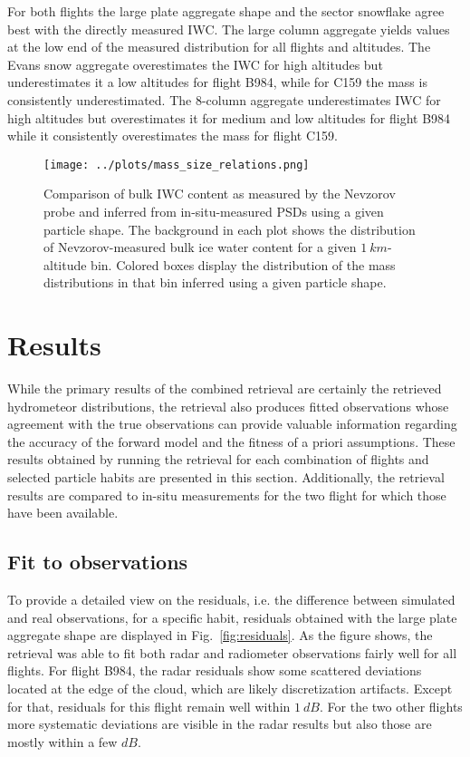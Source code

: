 \documentclass[journal abbreviation, manuscript]{copernicus}
\begin{document}
For both flights the large plate aggregate shape and the sector snowflake agree
best with the directly measured IWC. The large column aggregate yields values at
the low end of the measured distribution for all flights and altitudes. The
Evans snow aggregate overestimates the IWC for high altitudes but underestimates
it a low altitudes for flight B984, while for C159 the mass is consistently
underestimated. The 8-column aggregate underestimates IWC for high altitudes but
overestimates it for medium and low altitudes for flight B984 while it
consistently overestimates the mass for flight C159.

\begin{figure}
  \centering
  \texttt{[image: ../plots/mass\_size\_relations.png]}
  \caption{
    Comparison of bulk IWC content as measured by the Nevzorov probe and
    inferred from in-situ-measured PSDs using a given particle shape. The
    background in each plot shows the distribution of Nevzorov-measured bulk
    ice water content for a given $1\ \unit{km}$-altitude bin. Colored boxes
    display the distribution of the mass distributions in that bin inferred
    using a given particle shape.
    }
  \label{fig:mass_size_relation}
\end{figure}


\section{Results}
\label{sec:results}

While the primary results of the combined retrieval are certainly the retrieved
hydrometeor distributions, the retrieval also produces fitted observations whose
agreement with the true observations can provide valuable information regarding
the accuracy of the forward model and the fitness of a priori assumptions. These
results obtained by running the retrieval for each combination of flights and
selected particle habits are presented in this section. Additionally, the
retrieval results are compared to in-situ measurements for the two flight for
which those have been available.


\subsection{Fit to observations}

To provide a detailed view on the residuals, i.e. the difference between
simulated and real observations, for a specific habit, residuals obtained with
the large plate aggregate shape are displayed in Fig.~\ref{fig:residuals}. As
the figure shows, the retrieval was able to fit both radar and radiometer
observations fairly well for all flights. For flight B984, the radar residuals
show some scattered deviations located at the edge of the cloud, which are
likely discretization artifacts. Except for that, residuals for this flight
remain well within $1\ \unit{dB}$. For the two other flights more systematic
deviations are visible in the radar results but also those are mostly within a
few $\unit{dB}$.
\end{document}
